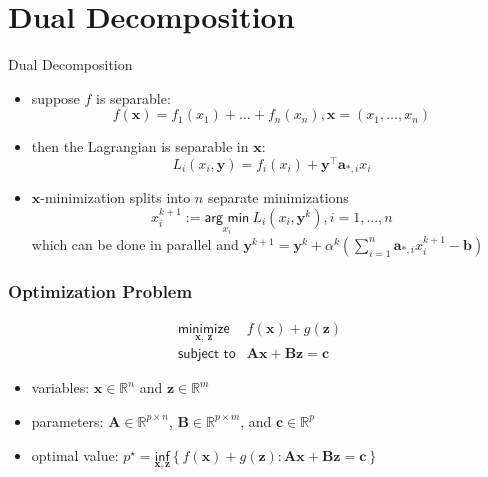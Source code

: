 \documentclass[aspectratio=169]{beamer}
\begin{document}
        \section*{Dual Decomposition}
        \begin{frame}{Dual Decomposition}
          \begin{itemize}
            \item suppose $f$ is separable:
            \begin{equation*}
              f(\bm x) = f_{1}(x_1) + \dots + f_n(x_n), \bm x = (x_1, \dots, x_n)
            \end{equation*}
            \item then the Lagrangian is separable in $\bm x$:
            \begin{equation*}
              L_i(x_i, \bm y) = f_i(x_i) + \bm y^\top\bm a_{*,i} x_i
            \end{equation*}
            \item $\bm x$-minimization splits into $n$ separate minimizations
            \begin{equation*}
              x^{k+1}_i := \underset{x_i}{\textsf{arg~min}}~ L_i(x_i, \bm y^k), i = 1, ..., n
            \end{equation*}
            which can be done in parallel and
              $\bm y^{k+1} = \bm y^k + \alpha^k\left(\sum_{i=1}^n \bm a_{*,i}x^{k+1}_i - \bm b\right)$
          \end{itemize}
        \end{frame}

    
    \begin{frame}
      \frametitle{Optimization Problem}
                  \vspace{1cm}
                    {\huge
                  \begin{equation}
                     \begin{array}{ll}
                       \underset{\bm x,~ \bm z}{\textsf{minimize}} & f(\bm x) + g(\bm z) \\
                       \textsf{subject to} & \bm A\bm x + \bm B \bm z = \bm c
                      \end{array}
                 \end{equation}
                    }
                 \begin{itemize}
                 \item variables: $\bm x \in \mathbb{R}^{n}$ and $\bm z \in \mathbb{R}^{m}$
                 \item parameters: $\bm A \in \mathbb{R}^{p\times n}$, $\bm B \in \mathbb{R}^{p\times m}$, and $\bm c \in \mathbb{R}^p$
                 \item optimal value: $p^\star = \underset{\bm x, \bm z}{\textsf{inf}}\left\{f(\bm x) + g(\bm z): \bm A\bm x + \bm B\bm z = \bm c\right\}$
                 \end{itemize}
    \end{frame}
 
\end{document}
